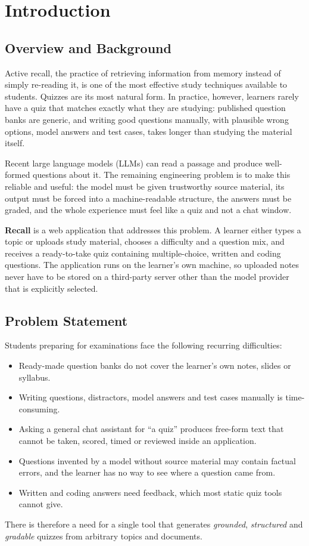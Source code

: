 \chapter{Introduction}

\section{Overview and Background}
Active recall, the practice of retrieving information from memory instead of simply re-reading it, is one of the most effective study techniques available to students. Quizzes are its most natural form. In practice, however, learners rarely have a quiz that matches exactly what they are studying: published question banks are generic, and writing good questions manually, with plausible wrong options, model answers and test cases, takes longer than studying the material itself.

Recent large language models (LLMs) can read a passage and produce well-formed questions about it. The remaining engineering problem is to make this reliable and useful: the model must be given trustworthy source material, its output must be forced into a machine-readable structure, the answers must be graded, and the whole experience must feel like a quiz and not a chat window.

\textbf{Recall} is a web application that addresses this problem. A learner either types a topic or uploads study material, chooses a difficulty and a question mix, and receives a ready-to-take quiz containing multiple-choice, written and coding questions. The application runs on the learner's own machine, so uploaded notes never have to be stored on a third-party server other than the model provider that is explicitly selected.

\section{Problem Statement}
Students preparing for examinations face the following recurring difficulties:
\begin{itemize}
\item Ready-made question banks do not cover the learner's own notes, slides or syllabus.
\item Writing questions, distractors, model answers and test cases manually is time-consuming.
\item Asking a general chat assistant for ``a quiz'' produces free-form text that cannot be taken, scored, timed or reviewed inside an application.
\item Questions invented by a model without source material may contain factual errors, and the learner has no way to see where a question came from.
\item Written and coding answers need feedback, which most static quiz tools cannot give.
\end{itemize}
There is therefore a need for a single tool that generates \textit{grounded}, \textit{structured} and \textit{gradable} quizzes from arbitrary topics and documents.

